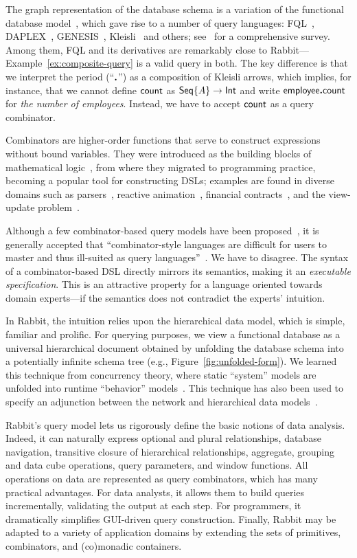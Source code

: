 The graph representation of the database schema is a variation of the
functional database model~\cite{Kerschberg1976, Sibley1977}, which gave rise to
a number of query languages: FQL~\cite{Buneman1979}, DAPLEX~\cite{Shipman1981},
GENESIS~\cite{Batory1988}, Kleisli~\cite{Wong2000} and others;
see~\cite{Gray2004} for a comprehensive survey.  Among them, FQL and its
derivatives are remarkably close to Rabbit---Example~\ref{ex:composite-query}
is a valid query in both.  The key difference is that we interpret the period
(``$\boldsymbol{.}$'') as a composition of Kleisli arrows, which implies, for instance,
that we cannot define $\mathsf{count}$ as $\mathsf{Seq}{\left\{A\right\}}\to\mathsf{Int}$ and write
$\mathsf{employee}\boldsymbol{.}\mathsf{count}$ for \emph{the number of employees}.  Instead, we have to
accept $\mathsf{count}$ as a query combinator.

Combinators are higher-order functions that serve to construct expressions
without bound variables.  They were introduced as the building blocks of
mathematical logic~\cite{Schoenfinkel1924, Curry1930}, from where they migrated
to programming practice, becoming a popular tool for constructing DSLs;
examples are found in diverse domains such as parsers~\cite{Wadler1985,
Hutton1996}, reactive animation~\cite{Elliott1997}, financial
contracts~\cite{Jones2000}, and the view-update problem~\cite{Foster2005}.

Although a few combinator-based query models have been
proposed~\cite{Buneman1979, Bossi1984, Batory1988, Erwig1991, Cherniack1996},
it is generally accepted that ``combinator-style languages are difficult for
users to master and thus ill-suited as query languages''~\cite{Cherniack1996}.
We have to disagree.  The syntax of a combinator-based DSL directly mirrors its
semantics, making it an \emph{executable specification}.  This is an attractive
property for a language oriented towards domain experts---if the semantics does
not contradict the experts' intuition.

In Rabbit, the intuition relies upon the hierarchical data model, which is
simple, familiar and prolific.  For querying purposes, we view a functional
database as a universal hierarchical document obtained by unfolding the
database schema into a potentially infinite schema tree (e.g.,
Figure~\ref{fig:unfolded-form}).  We learned this technique from concurrency
theory, where static ``system'' models are unfolded into runtime ``behavior''
models~\cite{Nielsen1994}.  This technique has also been used to specify an
adjunction between the network and hierarchical data
models~\cite{Cartmell1985}.

Rabbit's query model lets us rigorously define the basic notions of data
analysis.  Indeed, it can naturally express optional and plural relationships,
database navigation, transitive closure of hierarchical relationships,
aggregate, grouping and data cube operations, query parameters, and window
functions.  All operations on data are represented as query combinators, which
has many practical advantages.  For data analysts, it allows them to build
queries incrementally, validating the output at each step.  For programmers, it
dramatically simplifies GUI-driven query construction.  Finally, Rabbit may be
adapted to a variety of application domains by extending the sets of
primitives, combinators, and (co)monadic containers.

